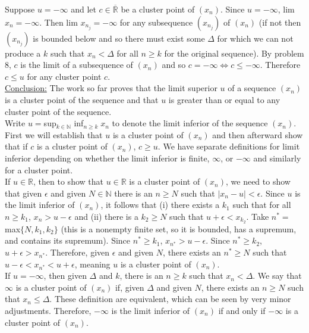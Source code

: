 \documentclass[a4paper]{article}
\begin{document}
Suppose $u =-\infty$ and let $c \in \overline{\mathbb{R}}$ be a cluster point of $(x_n)$. Since $u = -\infty$, lim $x_n = -\infty$. Then lim $x_{n_j} = -\infty$ for any subsequence $(x_{n_j})$ of $(x_n)$ (if not then $(x_{n_j})$ is bounded below and so there must exist some $\Delta$ for which we can not produce a $k$ such that $x_n < \Delta$ for all $n\geq k$ for the original sequence). By problem 8, $c$ is the limit of a subsequence of $(x_n)$ and so $c = -\infty \iff c\leq -\infty$. Therefore $c\leq u$ for any cluster point $c$. \\

\underline{Conclusion:} The work so far proves that the limit superior $u$ of a sequence $(x_n)$ is a cluster point of the sequence and that $u$ is greater than or equal to any cluster point of the sequence. \\

Write $u = $sup$_{k\in \mathbb{N}} $ inf$_{n \geq k} \; x_n$ to denote the limit inferior of the sequence $(x_n)$. First we will establish that $u$ is a cluster point of $(x_n)$ and then afterward show that if $c$ is a cluster point of $(x_n)$, $c\geq u$. We have separate definitions for limit inferior depending on whether the limit inferior is finite, $\infty$, or $-\infty$ and similarly for a cluster point. \\

If $u \in \mathbb{R}$, then to show that $u \in \mathbb{R}$ is a cluster point of $(x_n)$, we need to show that given $\epsilon$ and given $N \in \mathbb{N}$ there is an $n \geq N$ such that $|x_n-u| < \epsilon$. Since $u$ is the limit inferior of $(x_n)$, it follows that (i)  there exists a $k_1$ such that for all $n \geq k_1$, $x_n > u - \epsilon$ and (ii) there is a $k_2 \geq N$ such that $u + \epsilon < x_{k_2}$. Take $n^* = $ max$\{N,k_1,k_2\}$ (this is a nonempty finite set, so it is bounded, has a supremum, and contains its supremum). Since $n^* \geq k_1$, $x_{n^*} > u - \epsilon$. Since $n^* \geq k_2$, $u + \epsilon > x_{n^*}$. Therefore, given $\epsilon$ and given $N$, there exists an $n^* \geq N$ such that $u - \epsilon < x_{n^*} < u + \epsilon$, meaning $u$ is a cluster point of $(x_n)$.\\

If $u = -\infty$, then given $\Delta$ and $k$, there is an $n \geq k$ such that $x_n < \Delta$. We say that $\infty$ is a cluster point of $(x_n)$ if, given $\Delta$ and given $N$, there exists an $n \geq N$ such that $x_n \leq \Delta$. These definition are equivalent, which can be seen by very minor adjustments. Therefore, $-\infty$ is the limit inferior of $(x_n)$ if and only if $-\infty$ is a cluster point of $(x_n)$. \\
\end{document}
